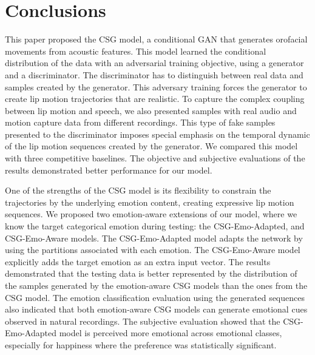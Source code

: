 \documentclass[10pt,journal,compsoc]{IEEEtran}
\begin{document}
\section{Conclusions}
\label{sec:conclusion}
This paper proposed the CSG model, a conditional GAN that generates orofacial movements from acoustic features. This model learned the conditional distribution of the data with an adversarial training objective, using a generator and a discriminator. The discriminator has to distinguish between real data and samples created by the generator. This adversary training forces the generator to create lip motion trajectories that are realistic. To capture the complex coupling between lip motion and speech, we also presented samples with real audio and motion capture data from different recordings. This type of fake samples presented to the discriminator imposes special emphasis on the temporal dynamic of the lip motion sequences created by the generator. We compared this model with three competitive baselines. The objective and subjective evaluations of the results demonstrated better performance for our model. 


One of the strengths of the CSG model is its flexibility to constrain the trajectories by the underlying emotion content, creating expressive lip motion sequences. We proposed two emotion-aware extensions of our model, where we know the target categorical emotion during testing: the CSG-Emo-Adapted, and CSG-Emo-Aware models. The CSG-Emo-Adapted model adapts the network by using the partitions associated with each emotion. The CSG-Emo-Aware model explicitly adds the target emotion as an extra input vector. The results demonstrated that the testing data is better represented by the distribution of the samples generated by the emotion-aware CSG models  than the ones from the CSG model. The emotion classification evaluation using the generated sequences also indicated that both emotion-aware CSG models can generate emotional cues observed in natural recordings. The subjective evaluation showed that the CSG-Emo-Adapted model is perceived more emotional across emotional classes, especially for happiness where the preference was statistically significant. 
\end{document}
